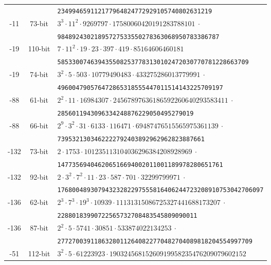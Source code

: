 \documentclass{amsart}
\begin{document}
\begin{table*}[ht]
\begin{tabularx}{\textwidth}{ccl}
         			&   & \tt  234994659112177964824772929105740802631219  \\    			
        -11  &  73-bit & \tt $3^3 \cdot 11^2 \cdot 9269797 \cdot 17580060420191283788101 ~\cdot$  \\
         			&   & \tt  98489243021895727533550278363068950783386787  \\   
        -19  &  110-bit & \tt $ 7 \cdot11^2  \cdot 19  \cdot 23  \cdot 397  \cdot 419 \cdot 85164606460181$  \\
         			&   & \tt 5853300746394355082537783130102472030770781228663709  \\   
        -19  &  74-bit & \tt $ 3^2 \cdot 5 \cdot 503 \cdot 10779490483 \cdot 433275286013779991 ~\cdot$  \\
         			&   & \tt 496004790576472865318555447011514143225709197 \\   
        -88  &  61-bit & \tt $ 2^2 \cdot 11 \cdot 16984307 \cdot 24567897636186592260640293583411~\cdot$  \\
         			&   & \tt 2856011943096334248876229050495279019 \\   
        -88  &  66-bit & \tt $ 2^9 \cdot 3^2 \cdot 31 \cdot 6133 \cdot 116471 \cdot 69487476515565975361139~\cdot$  \\
         			&   & \tt 7395321303462222792403892962962823887661 \\   
        -132 &  73-bit & \tt $  2 \cdot 1753 \cdot 101235113104036296384208928969~\cdot$  \\
         			&   & \tt  147735694046206516694002011001189978280651761\\   			
        -132 &  92-bit & \tt $ 2 \cdot 3^2 \cdot 7^2 \cdot 11 \cdot 23 \cdot 587 \cdot 701 \cdot 32299799971~\cdot$  \\
         			&   & \tt  17680048930794323282297555816406244723208910753042706097\\   	
        -136 &  62-bit & \tt $  2^3 \cdot 7^3 \cdot 19^3 \cdot 10939 \cdot 11131315086725327441688173207 ~\cdot$  \\
         			&   & \tt  22880183990722565732708483545809090011\\  
        -136 &  87-bit & \tt $  2^2 \cdot 5 \cdot 5741 \cdot 30851 \cdot 533874022134253  ~\cdot$  \\
         			&   & \tt   27727003911863280112640822770482704089818204554997709\\  
       	 -51 &  112-bit & \tt $  3^2 \cdot 5 \cdot 61223923 \cdot 19032456815260919958235476209079602152$  \\

\end{tabularx}
\end{table*}
\end{document}

